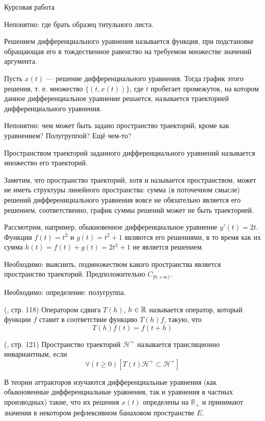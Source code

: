 
\LARGE



Курсовая работа


Непонятно: где брать образец титульного листа.


\opred
Решением дифференциального уравнения называется функция, при подстановке обращающая его в тождественное равенство на требуемом множестве значений аргумента.

\opred
Пусть $x(t)$ --- решение дифференциального уравнения.
Тогда график этого решения, т. е. множество $\{(t,x(t))\}$,
где $t$ пробегает промежуток, на котором данное дифференциальное уравнение решается,
называется траекторией дифференциального уравнения.


Непонятно: чем может быть задано пространство траекторий, кроме как уравнением?
Полугруппой?
Ещё чем-то?


\opred
Пространством траекторий заданного дифференциального уравнений называется множество его траекторий.

Заметим, что пространство траекторий, хотя и называется пространством, может не иметь структуры линейного пространства:
сумма (в поточечном смысле) решений дифференициального уравнения вовсе не обязательно является его решением,
соответственно, график суммы решений может не быть траекторией.

Рассмотрим, например, обыкновенное дифференциальное уравнение $y'(t) = 2t$.
Функции $f(t)=t^2$ и $g(t)=t^2 +1$ являются его решениями, в то время как их сумма $h(t) = f(t) + g(t) = 2t^2 + 1$ не является решением.


Необходимо: выяснить, подмножеством какого пространства является пространство траекторий.
Предположительно $C_{[0;+\infty)}$.



Необходимо: определение: полугруппа.


\opred (\cite{Zelenaya}, стр. 118)
Оператором сдвига $T(h)$, $h\in\mathbb{R}$ называется оператор, который функции $f$ ставит в соответствие функцию $T(h)f$, такую, что
$$
T(h)f(t)=f(t+h)
$$


\opred (\cite{Zelenaya}, стр. 121)
Пространство траекторий $\mathcal{H}^+$ называется трансляционно инвариантным, если
$$
\forall(t \geq 0)\left[T(t)\mathcal{H}^+ \subset \mathcal{H}^+ \right]
$$


В теории аттракторов изучаются дифференциальные уравнения (как обыкновенные дифференциальные уравнения, так и уравнения в частных производных) такие, что их решения $x(t)$ определены на $\mathbb{R}_+$ и принимают значения в некотором рефлексивном банаховом пространстве $E$.


